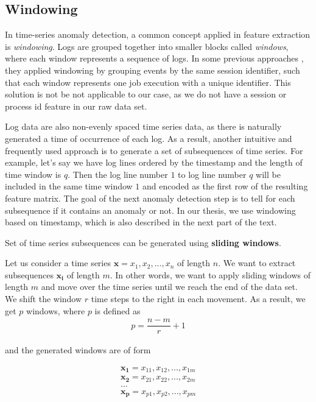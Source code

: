 \subsection{Windowing}

In time-series anomaly detection, a common concept applied in feature extraction is \textit{windowing}. 
Logs are grouped together into smaller blocks called \textit{windows}, where each window represents a sequence of logs. In some previous approaches \cite{xu2009}, they applied windowing by grouping events by the same session identifier, such that each window represents one job execution with a unique identifier. This solution is not be not applicable to our case, as we do not have a session or process id feature in our raw data set.

Log data are also non-evenly spaced time series data, as there is naturally generated a time of occurrence of each log. As a result, another intuitive and frequently used approach is to generate a set of subsequences of time series. For example, let's say we have log lines ordered by the timestamp and the length of time window is $q$. Then the log line number $1$ to log line number $q$ will be included in the same time window $1$ and encoded as the first row of the resulting feature matrix. The goal of the next anomaly detection step is to tell for each subsequence if it contains an anomaly or not. In our thesis, we use windowing based on timestamp, which is also described in the next part of the text.    

Set of time series subsequences can be generated using \textbf{sliding windows}.

Let us consider a time series $\mathbf{x} = x_1, x_2, ..., x_n$ of length $n$. We want to extract subsequences $\mathbf{x_i}$ of length $m$. In other words, we want to apply sliding windows of length $m$ and move over the time series until we reach the end of the data set. We shift the window $r$ time steps to the right in each movement. As a result, we get $p$ windows, where $p$ is defined as 
    \begin{gather*}
        p = \dfrac{n - m}{r} + 1
    \end{gather*}

and the generated windows are of form 

\begin{gather*}
    \mathbf{x_1} = x_{11}, x_{12},..., x_{1m} \\
    \mathbf{x_2} = x_{21}, x_{22},..., x_{2m} \\
    \ldots\\
    \mathbf{x_p} = x_{p1}, x_{p2},..., x_{pm} 
\end{gather*}

